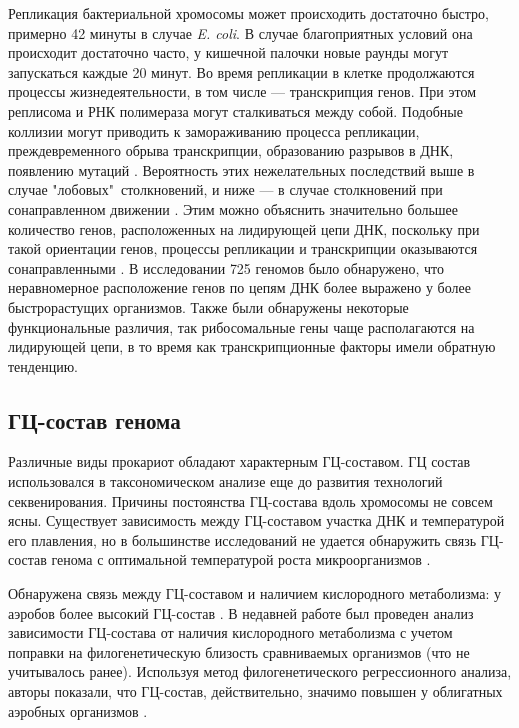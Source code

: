 Репликация бактериальной хромосомы может происходить достаточно быстро, примерно 42 минуты в случае \textit{E. coli}. В случае благоприятных условий она происходит достаточно часто, у кишечной палочки новые раунды могут запускаться каждые 20 минут. Во время репликации в клетке продолжаются процессы жизнедеятельности, в том числе --- транскрипция генов. При этом реплисома и РНК полимераза могут сталкиваться между собой. Подобные коллизии могут приводить к замораживанию процесса репликации, преждевременного обрыва транскрипции, образованию разрывов в ДНК, появлению мутаций \cite{sankar2016nature}. Вероятность этих нежелательных последствий выше в случае "лобовых"\ столкновений, и ниже --- в случае столкновений при сонаправленном движении \cite{sankar2016nature}. Этим можно объяснить значительно большее количество генов, расположенных на лидирующей цепи ДНК, поскольку при такой ориентации генов, процессы репликации и транскрипции оказываются сонаправленными \cite{brewer1988polymerases}. В исследовании 725 геномов \cite{mao2012percentage} было обнаружено, что неравномерное расположение генов по цепям ДНК более выражено у более быстрорастущих организмов. Также были обнаружены некоторые функциональные различия, так рибосомальные гены чаще располагаются на лидирующей цепи, в то время как транскрипционные факторы имели обратную тенденцию.

\subsection{ГЦ-состав генома}
Различные виды прокариот обладают характерным ГЦ-составом. ГЦ состав использовался в таксономическом анализе еще до развития технологий секвенирования. Причины постоянства ГЦ-состава вдоль хромосомы не совсем ясны. Существует зависимость между ГЦ-составом участка ДНК и температурой его плавления, но в большинстве исследований не удается обнаружить связь ГЦ-состав генома с оптимальной температурой роста микроорганизмов \cite{galtier1997relationships, wang2006correlation}. 

Обнаружена связь между ГЦ-составом и наличием кислородного метаболизма: у аэробов более высокий ГЦ-состав \cite{naya2002aerobiosis}. В недавней работе был проведен анализ зависимости ГЦ-состава от наличия кислородного метаболизма с учетом поправки на филогенетическую близость сравниваемых организмов (что не учитывалось ранее). Используя метод филогенетического регрессионного анализа, авторы показали, что ГЦ-состав, действительно, значимо повышен у облигатных аэробных организмов \cite{aslam2019aerobic}. 


